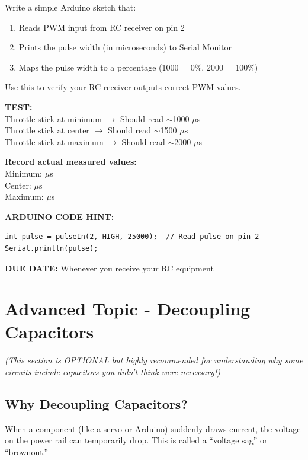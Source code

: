 \documentclass[11pt,letterpaper]{article}
\begin{document}
Write a simple Arduino sketch that:
\begin{enumerate}
\item Reads PWM input from RC receiver on pin 2
\item Prints the pulse width (in microseconds) to Serial Monitor
\item Maps the pulse width to a percentage (1000 = 0\%, 2000 = 100\%)
\end{enumerate}

Use this to verify your RC receiver outputs correct PWM values.

\textbf{TEST:}\\
Throttle stick at minimum $\rightarrow$ Should read $\sim$1000 $\mu$s\\
Throttle stick at center $\rightarrow$ Should read $\sim$1500 $\mu$s\\
Throttle stick at maximum $\rightarrow$ Should read $\sim$2000 $\mu$s

\textbf{Record actual measured values:}\\
Minimum: \underline{\hspace{3cm}} $\mu$s\\
Center: \underline{\hspace{3cm}} $\mu$s\\
Maximum: \underline{\hspace{3cm}} $\mu$s

\textbf{ARDUINO CODE HINT:}
\begin{verbatim}
int pulse = pulseIn(2, HIGH, 25000);  // Read pulse on pin 2
Serial.println(pulse);
\end{verbatim}

\textbf{DUE DATE:} Whenever you receive your RC equipment

\newpage
\section{Advanced Topic - Decoupling Capacitors}

\textit{(This section is OPTIONAL but highly recommended for understanding why some circuits include capacitors you didn't think were necessary!)}

\subsection{Why Decoupling Capacitors?}

When a component (like a servo or Arduino) suddenly draws current, the voltage on the power rail can temporarily drop. This is called a ``voltage sag'' or ``brownout.''
\end{document}
